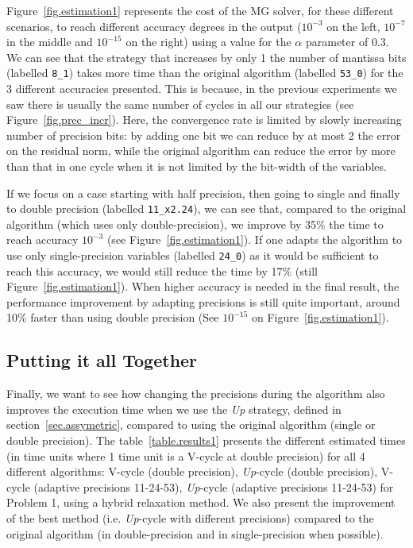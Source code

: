 Figure~\ref{fig.estimation1} represents the cost of the MG solver, for these
different scenarios, to reach different accuracy degrees in the output
($10^{-3}$ on the left, $10^{-7}$ in the middle and $10^{-15}$ on the right)
using a value for the $\alpha$ parameter of $0.3$. We can see that the strategy
that increases by only 1 the number of mantissa bits (labelled \texttt{8\_1})
takes more time than the original algorithm (labelled \texttt{53\_0}) for the 3
different accuracies presented. This is because, in the previous experiments we
saw there is usually the same number of cycles in all our strategies (see
Figure~\ref{fig.prec_incr}). Here, the convergence rate is limited by slowly
increasing number of precision bits: by adding one bit we can reduce by at most
2 the error on the residual norm, while the original algorithm can reduce the
error by more than that in one cycle when it is not limited by the bit-width of
the variables.

If we focus on a case starting with half precision, then going to single and
finally to double precision (labelled \texttt{11\_x2.24}), we can see that,
compared to the original algorithm (which uses only double-precision), we
improve by 35\% the time to reach accuracy $10^{-3}$ (see
Figure~\ref{fig.estimation1}). If one adapts the algorithm to use only
single-precision variables (labelled \texttt{24\_0}) as it would be sufficient
to reach this accuracy, we would still reduce the time by 17\% (still
Figure~\ref{fig.estimation1}). When higher accuracy is needed in the final
result, the performance improvement by adapting precisions is still quite
important, around 10\% faster than using double precision (See $10^{-15}$ on
Figure~\ref{fig.estimation1}).


\subsection{Putting it all Together}

Finally, we want to see how changing the precisions during the algorithm also
improves the execution time when we use the \emph{Up} strategy, defined in
section~\ref{sec.assymetric}, compared to using the original algorithm (single
or double precision). The table~\ref{table.results1} presents the different
estimated times (in time units where 1 time unit is a V-cycle at double
precision) for all 4 different algorithms: V-cycle (double precision),
\emph{Up}-cycle (double precision), V-cycle (adaptive precisions 11-24-53),
\emph{Up}-cycle (adaptive precisions 11-24-53) for Problem 1, using a hybrid
relaxation method.  We also present the improvement of the best method (i.e.
\emph{Up}-cycle with different precisions) compared to the original algorithm
(in double-precision and in single-precision when possible).

